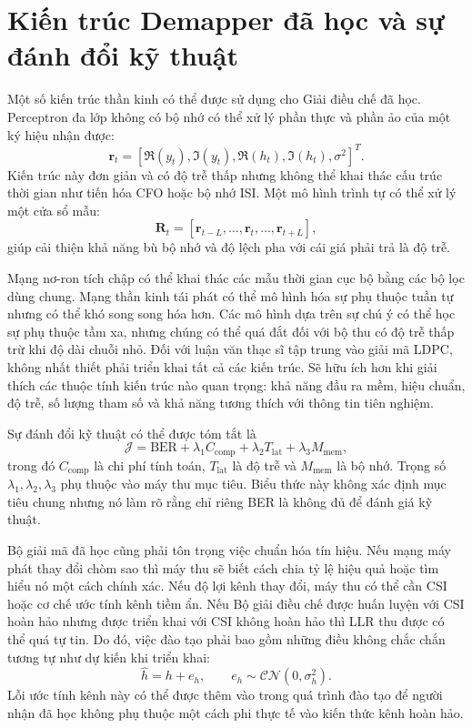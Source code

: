 \section{Kiến trúc Demapper đã học và sự đánh đổi kỹ thuật}
Một số kiến ​​trúc thần kinh có thể được sử dụng cho Giải điều chế đã học. Perceptron đa lớp không có bộ nhớ có thể xử lý phần thực và phần ảo của một ký hiệu nhận được:
\begin{equation}
  \mathbf{r}_t=[\Re(y_t),\Im(y_t),\Re(h_t),\Im(h_t),\sigma^2]^T.
\end{equation}
Kiến trúc này đơn giản và có độ trễ thấp nhưng không thể khai thác cấu trúc thời gian như tiến hóa CFO hoặc bộ nhớ ISI. Một mô hình trình tự có thể xử lý một cửa sổ mẫu:
\begin{equation}
  \mathbf{R}_t=[\mathbf{r}_{t-L},\ldots,\mathbf{r}_t,\ldots,\mathbf{r}_{t+L}],
\end{equation}
giúp cải thiện khả năng bù bộ nhớ và độ lệch pha với cái giá phải trả là độ trễ.

Mạng nơ-ron tích chập có thể khai thác các mẫu thời gian cục bộ bằng các bộ lọc dùng chung. Mạng thần kinh tái phát có thể mô hình hóa sự phụ thuộc tuần tự nhưng có thể khó song song hóa hơn. Các mô hình dựa trên sự chú ý có thể học sự phụ thuộc tầm xa, nhưng chúng có thể quá đắt đối với bộ thu có độ trễ thấp trừ khi độ dài chuỗi nhỏ. Đối với luận văn thạc sĩ tập trung vào giải mã LDPC, không nhất thiết phải triển khai tất cả các kiến ​​trúc. Sẽ hữu ích hơn khi giải thích các thuộc tính kiến ​​trúc nào quan trọng: khả năng đầu ra mềm, hiệu chuẩn, độ trễ, số lượng tham số và khả năng tương thích với thông tin tiên nghiệm.

Sự đánh đổi kỹ thuật có thể được tóm tắt là
\begin{equation}
  \mathcal{J}
  =
  \mathrm{BER}
  +\lambda_1 C_{\mathrm{comp}}
  +\lambda_2 T_{\mathrm{lat}}
  +\lambda_3 M_{\mathrm{mem}},
\end{equation}
trong đó $C_{\mathrm{comp}}$ là chi phí tính toán, $T_{\mathrm{lat}}$ là độ trễ và $M_{\mathrm{mem}}$ là bộ nhớ. Trọng số $\lambda_1,\lambda_2,\lambda_3$ phụ thuộc vào máy thu mục tiêu. Biểu thức này không xác định mục tiêu chung nhưng nó làm rõ rằng chỉ riêng BER là không đủ để đánh giá kỹ thuật.

Bộ giải mã đã học cũng phải tôn trọng việc chuẩn hóa tín hiệu. Nếu mạng máy phát thay đổi chòm sao thì máy thu sẽ biết cách chia tỷ lệ hiệu quả hoặc tìm hiểu nó một cách chính xác. Nếu độ lợi kênh thay đổi, máy thu có thể cần CSI hoặc cơ chế ước tính kênh tiềm ẩn. Nếu Bộ giải điều chế được huấn luyện với CSI hoàn hảo nhưng được triển khai với CSI không hoàn hảo thì LLR thu được có thể quá tự tin. Do đó, việc đào tạo phải bao gồm những điều không chắc chắn tương tự như dự kiến ​​khi triển khai:
\begin{equation}
  \hat{h}=h+e_h, \qquad e_h\sim\mathcal{CN}(0,\sigma_h^2).
\end{equation}
Lỗi ước tính kênh này có thể được thêm vào trong quá trình đào tạo để người nhận đã học không phụ thuộc một cách phi thực tế vào kiến ​​thức kênh hoàn hảo.

